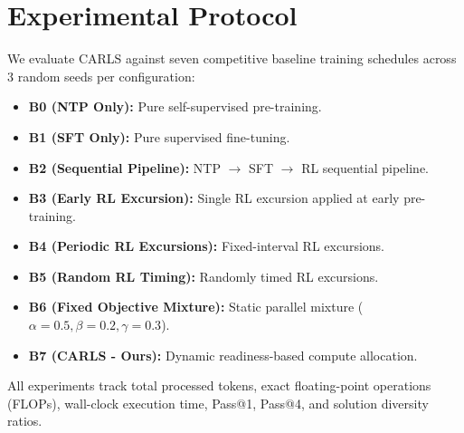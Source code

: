 \section{Experimental Protocol}
\label{sec:experimental_protocol}

We evaluate CARLS against seven competitive baseline training schedules across 3 random seeds per configuration:
\begin{itemize}
    \item \textbf{B0 (NTP Only):} Pure self-supervised pre-training.
    \item \textbf{B1 (SFT Only):} Pure supervised fine-tuning.
    \item \textbf{B2 (Sequential Pipeline):} NTP $\rightarrow$ SFT $\rightarrow$ RL sequential pipeline.
    \item \textbf{B3 (Early RL Excursion):} Single RL excursion applied at early pre-training.
    \item \textbf{B4 (Periodic RL Excursions):} Fixed-interval RL excursions.
    \item \textbf{B5 (Random RL Timing):} Randomly timed RL excursions.
    \item \textbf{B6 (Fixed Objective Mixture):} Static parallel mixture ($\alpha=0.5, \beta=0.2, \gamma=0.3$).
    \item \textbf{B7 (CARLS - Ours):} Dynamic readiness-based compute allocation.
\end{itemize}

All experiments track total processed tokens, exact floating-point operations (FLOPs), wall-clock execution time, Pass@1, Pass@4, and solution diversity ratios.
